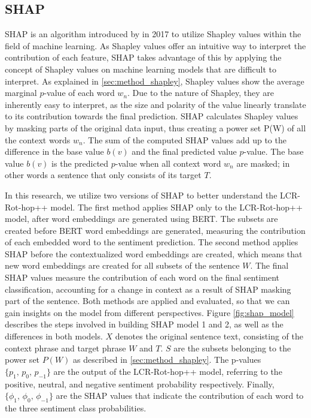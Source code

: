 \subsection{SHAP}
    \label{sec:method_SHAP}
SHAP is an algorithm introduced by \cite{Lundberg} in 2017 to utilize Shapley values within the field of machine learning. As Shapley values offer an intuitive way to interpret the contribution of each feature, SHAP takes advantage of this by applying the concept of Shapley values on machine learning models that are difficult to interpret. 
As explained in \ref{sec:method_shapley}, Shapley values show the average marginal $p$-value of each word $w_n$. Due to the nature of Shapley, they are inherently easy to interpret, as the size and polarity of the value linearly translate to its contribution towards the final prediction. SHAP calculates Shapley values by masking parts of the original data input, thus creating a power set P(W) of all the context words $w_n$. The sum of the computed SHAP values add up to the difference in the base value $b(v)$ and the final predicted value $p$-value. The base value $b(v)$ is the predicted $p$-value when all context word $w_n$ are masked; in other words a sentence that only consists of its target $T$.

In this research, we utilize two versions of SHAP to better understand the LCR-Rot-hop++ model. The first method applies SHAP only to the LCR-Rot-hop++ model, after word embeddings are generated using BERT. The subsets are created before BERT word embeddings are generated, measuring the contribution of each embedded word to the sentiment prediction. The second method applies SHAP before the contextualized word embeddings are created, which means that new word embeddings are created for all subsets of the sentence $W$. The final SHAP values measure the contribution of each word on the final sentiment classification, accounting for a change in context as a result of SHAP masking part of the sentence. Both methods are applied and evaluated, so that we can gain insights on the model from different perspectives. Figure \ref{fig:shap_model} describes the steps involved in building SHAP model 1 and 2, as well as the differences in both models. $X$ denotes the original sentence text, consisting of the context phrase and target phrase $W$ and $T$. $S$ are the subsets belonging to the power set $P(W)$ as described in \ref{sec:method_shapley}. The p-values $\{p_1,\, p_0,\, p_{-1}\}$ are the output of the LCR-Rot-hop++ model, referring to the positive, neutral, and negative sentiment probability respectively. Finally, $\{\phi_1,\, \phi_0,\, \phi_{-1}\}$ are the SHAP values that indicate the contribution of each word to the three sentiment class probabilities.



